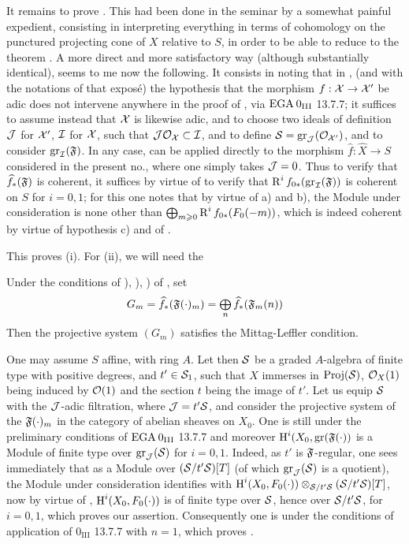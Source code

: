 It remains to prove . This had been done in the
seminar by a somewhat painful expedient, consisting in
interpreting everything in terms of cohomology on the punctured
projecting cone of $X$ relative to $S$, in order to be able to
reduce to the theorem . A more direct and more
satisfactory way (although substantially identical), seems to
me now the following. It consists in noting that in ,
\numero {}\label{XII.14} (and with the
notations of that expos\'e) the hypothesis that the morphism
$f:\Xx\to\Xx'$ be adic does not intervene anywhere in the
proof of , via $\textup{EGA}\kern.2em 0_{\textup{III}}$ 13.7.7;
it suffices to assume instead that ${\mathcal X}$ is likewise adic,
and to choose two ideals of definition ${\mathcal J}$ for ${\mathcal X}'$, ${\mathcal I}$
for ${\mathcal X}$, such that ${\mathcal J}{\mathcal O}_{\mathcal X}\subset{\mathcal I}$, and to define
${\mathcal S}=\operatorname{gr}_{\mathcal J}({\mathcal O}_{{\mathcal X}'})$, and to consider $\operatorname{gr}_{\mathcal I}(\mathfrak{F})$. In
any case,  can be applied directly to the
morphism $\widehat{f}:\widehat{X}\to S$ considered in the present
no., where one simply takes ${\mathcal J}=0$. Thus to verify that
$\widehat{f}_\ast(\mathfrak{F})$ is coherent, it suffices by virtue of
\loccit to verify that $\operatorname{R}^if_{0\ast}(\operatorname{gr}_{\mathcal I}(\mathfrak{F}))$ is
coherent on $S$ for $i=0, 1$; for this one notes that by virtue of
a) and b), the Module under consideration is none other than
$\bigoplus_{m\geqslant 0}\operatorname{R}^if_{0\ast}(F_0(-m))$, which
is indeed coherent by virtue of hypothesis c) and of
.

This proves  (i). For  (ii), we will need the

\begin{lemma} \label{XII.3.3}
Under the conditions of ), ), ) of , set
\[
G_m= \widehat{f}_\ast(\mathfrak{F}(\cdot)_m) = \mathop{\textstyle\bigoplus}\limits_n\widehat{f}_\ast(\mathfrak{F}_m(n))
\]
Then the projective system $(G_m)$ satisfies the Mittag-Leffler condition.
\end{lemma}

One may assume $S$ affine, with ring $A$. Let then ${\mathcal S}$ be a graded $A$-algebra of finite type with positive degrees, and $t'\in{\mathcal S}_1$, such that $X$ immerses in $\operatorname{Proj}({\mathcal S})$, $\mathcal{O}_X(1)$ being induced by ${\mathcal O}(1)$ and the section $t$ being the image of $t'$. Let us equip ${\mathcal S}$ with the ${\mathcal J}$-adic filtration, where ${\mathcal J}=t'{\mathcal S}$, and consider the projective system of the $\mathfrak{F}(\cdot)_m$ in the category of abelian sheaves on $X_0$. One is still under the preliminary conditions of $\textup{EGA}\kern.2em 0_{\textup{III}}$ 13.7.7 and moreover $\operatorname{H}^i(X_0, \operatorname{gr}(\mathfrak{F}(\cdot))$ is a Module of finite type over $\operatorname{gr}_{\mathcal J}({\mathcal S})$ for $i=0, 1$. Indeed, as $t'$ is $\mathfrak{F}$-regular, one sees immediately that as a Module over $({\mathcal S} /t'{\mathcal S})[T]$ (of which $\operatorname{gr}_{\mathcal J}({\mathcal S})$ is a quotient), the Module under consideration identifies with $\operatorname{H}^i(X_0, F_0(\cdot))\otimes_{{\mathcal S} /t'{\mathcal S}}({\mathcal S} /t'{\mathcal S})[T]$, now by virtue of , $\operatorname{H}^i(X_0, F_0(\cdot))$ is of finite type over ${\mathcal S}$, hence over ${\mathcal S} /t'{\mathcal S}$, for $i=0, 1$, which proves our assertion. Consequently one is under the conditions of application of $0_{\text{III}}$ 13.7.7 with $n=1$, which proves .

